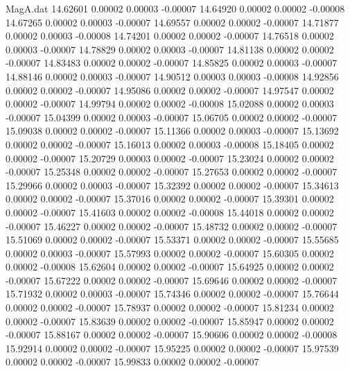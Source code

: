\begin{filecontents}{MagA.dat}
  14.62601    0.00002    0.00003   -0.00007
  14.64920    0.00002    0.00002   -0.00008
  14.67265    0.00002    0.00003   -0.00007
  14.69557    0.00002    0.00002   -0.00007
  14.71877    0.00002    0.00003   -0.00008
  14.74201    0.00002    0.00002   -0.00007
  14.76518    0.00002    0.00003   -0.00007
  14.78829    0.00002    0.00003   -0.00007
  14.81138    0.00002    0.00002   -0.00007
  14.83483    0.00002    0.00002   -0.00007
  14.85825    0.00002    0.00003   -0.00007
  14.88146    0.00002    0.00003   -0.00007
  14.90512    0.00003    0.00003   -0.00008
  14.92856    0.00002    0.00002   -0.00007
  14.95086    0.00002    0.00002   -0.00007
  14.97547    0.00002    0.00002   -0.00007
  14.99794    0.00002    0.00002   -0.00008
  15.02088    0.00002    0.00003   -0.00007
  15.04399    0.00002    0.00003   -0.00007
  15.06705    0.00002    0.00002   -0.00007
  15.09038    0.00002    0.00002   -0.00007
  15.11366    0.00002    0.00003   -0.00007
  15.13692    0.00002    0.00002   -0.00007
  15.16013    0.00002    0.00003   -0.00008
  15.18405    0.00002    0.00002   -0.00007
  15.20729    0.00003    0.00002   -0.00007
  15.23024    0.00002    0.00002   -0.00007
  15.25348    0.00002    0.00002   -0.00007
  15.27653    0.00002    0.00002   -0.00007
  15.29966    0.00002    0.00003   -0.00007
  15.32392    0.00002    0.00002   -0.00007
  15.34613    0.00002    0.00002   -0.00007
  15.37016    0.00002    0.00002   -0.00007
  15.39301    0.00002    0.00002   -0.00007
  15.41603    0.00002    0.00002   -0.00008
  15.44018    0.00002    0.00002   -0.00007
  15.46227    0.00002    0.00002   -0.00007
  15.48732    0.00002    0.00002   -0.00007
  15.51069    0.00002    0.00002   -0.00007
  15.53371    0.00002    0.00002   -0.00007
  15.55685    0.00002    0.00003   -0.00007
  15.57993    0.00002    0.00002   -0.00007
  15.60305    0.00002    0.00002   -0.00008
  15.62604    0.00002    0.00002   -0.00007
  15.64925    0.00002    0.00002   -0.00007
  15.67222    0.00002    0.00002   -0.00007
  15.69646    0.00002    0.00002   -0.00007
  15.71932    0.00002    0.00003   -0.00007
  15.74346    0.00002    0.00002   -0.00007
  15.76644    0.00002    0.00002   -0.00007
  15.78937    0.00002    0.00002   -0.00007
  15.81234    0.00002    0.00002   -0.00007
  15.83639    0.00002    0.00002   -0.00007
  15.85947    0.00002    0.00002   -0.00007
  15.88167    0.00002    0.00002   -0.00007
  15.90606    0.00002    0.00002   -0.00008
  15.92914    0.00002    0.00002   -0.00007
  15.95225    0.00002    0.00002   -0.00007
  15.97539    0.00002    0.00002   -0.00007
  15.99833    0.00002    0.00002   -0.00007

\end{filecontents}
